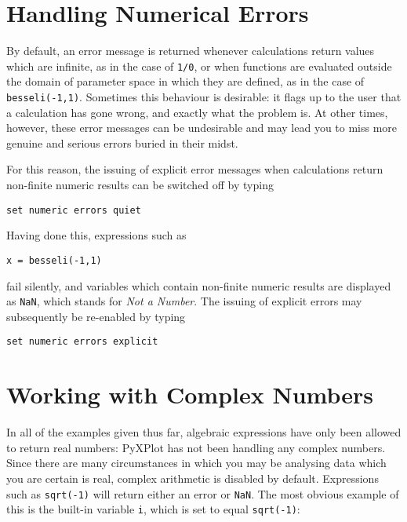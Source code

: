 \section{Handling Numerical Errors}
\label{sec:num_errs}

By default, an error message is returned whenever calculations return values
which are infinite, as in the case of {\tt 1/0}, or when functions are
evaluated outside the domain of parameter space in which they are defined, as
in the case of {\tt besseli(-1,1)}.  Sometimes this behaviour is desirable: it
flags up to the user that a calculation has gone wrong, and exactly what the
problem is.  At other times, however, these error messages can be undesirable
and may lead you to miss more genuine and serious errors buried in their midst.

For this reason, the issuing of explicit error messages when calculations
return non-finite numeric results can be switched off by typing

\begin{verbatim}
set numeric errors quiet
\end{verbatim}

\noindent Having done this, expressions such as

\begin{verbatim}
x = besseli(-1,1)
\end{verbatim}

\noindent fail silently, and variables which contain non-finite numeric results
are displayed as {\tt NaN}, which stands for {\it Not a
Number}.  The issuing of explicit errors may subsequently
be re-enabled by typing 

\begin{verbatim}
set numeric errors explicit
\end{verbatim}

\section{Working with Complex Numbers}
\label{sec:complex_numbers}

In all of the examples given thus far, algebraic expressions have only been
allowed to return real numbers: PyXPlot has not been handling any complex
numbers. Since there are many circumstances in which you may be analysing data
which you are certain is real, complex arithmetic is disabled by default.
Expressions such as {\tt sqrt(-1)} will return either an error or {\tt NaN}.
The most obvious example of this is the built-in variable {\tt i}, which is set
to equal {\tt sqrt(-1)}:

